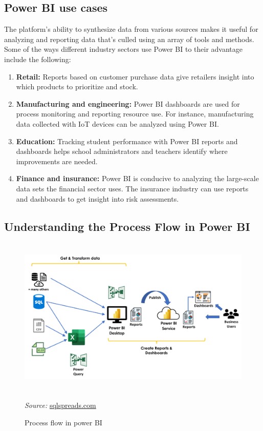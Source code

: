 \subsection{Power BI use cases}
The platform's ability to synthesize data from various sources makes it useful for analyzing and reporting data that's culled using an array of tools and methods. Some of the ways different industry sectors use Power BI to their advantage include the following:
\begin{enumerate}
    \item \textbf{Retail:} Reports based on customer purchase data give retailers insight into which products to prioritize and stock.
    \item \textbf{Manufacturing and engineering:} Power BI dashboards are used for process monitoring and reporting resource use. For instance, manufacturing data collected with IoT devices can be analyzed using Power BI. \\
    \item \textbf{Education:} Tracking student performance with Power BI reports and dashboards helps school administrators and teachers identify where improvements are needed.
    \item \textbf{Finance and insurance:} Power BI is conducive to analyzing the large-scale data sets the financial sector uses. The insurance industry can use reports and dashboards to get insight into risk assessments.
\end{enumerate}

\subsection{Understanding the Process Flow in Power BI}

\begin{figure}[h]
    \centering
    \includegraphics[width=5.0in, height=3.0in]{Figure/Power_BI_Process.png}
    \caption{Process flow in power BI }
    \label{fig:enter-label}
   \textit{Source:} \href{https://sqlspreads.com/blog/power-bi-dashboards-examples-use-cases/}{sqlspreads.com}
\end{figure}

